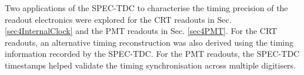 Two applications of the SPEC-TDC to characterise the timing precision of the readout electronics were explored for the CRT readouts in Sec. \ref{sec4InternalClock} and the PMT readouts in Sec. \ref{sec4PMT}.
For the CRT readouts, an alternative timing reconstruction was also derived using the timing information recorded by the SPEC-TDC.
For the PMT readouts, the SPEC-TDC timestamps helped validate the timing synchronisation across multiple digitisers. 




